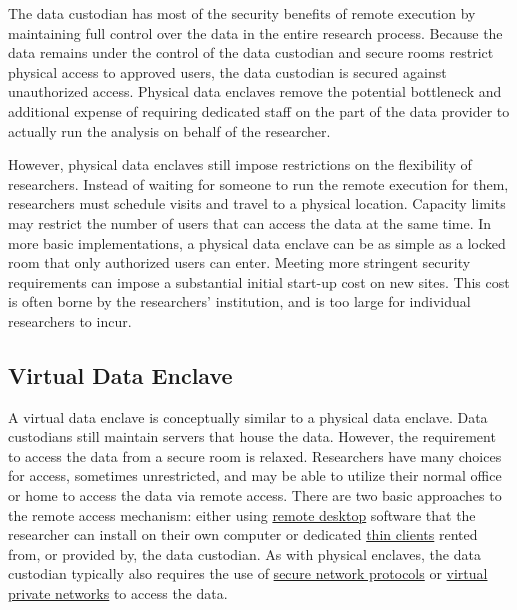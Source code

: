 The data custodian has most of the security benefits of remote execution by maintaining full control over the data in the entire research process. Because the data remains under the control of the data custodian and secure rooms restrict physical access to approved users, the data custodian is secured against unauthorized access. Physical data enclaves remove the potential bottleneck and additional expense of requiring dedicated staff on the part of the data provider to actually run the analysis on behalf of the researcher.

However, physical data enclaves still impose restrictions on the flexibility of researchers. Instead of waiting for someone to run the remote execution for them, researchers must schedule visits and travel to a physical location. Capacity limits may restrict the number of users that can access the data at the same time. In more basic implementations, a physical data enclave can be as simple as a locked room that only authorized users can enter. Meeting more stringent security requirements can impose a substantial initial start-up cost on new sites. This cost is often borne by the researchers' institution, and is too large for individual researchers to incur.

\hypertarget{virtual-data-enclave}{%
\subsection{Virtual Data Enclave}\label{virtual-data-enclave}}

A virtual data enclave is conceptually similar to a physical data enclave. Data custodians still maintain servers that house the data. However, the requirement to access the data from a secure room is relaxed. Researchers have many choices for access, sometimes unrestricted, and may be able to utilize their normal office or home to access the data via remote access. There are two basic approaches to the remote access mechanism: either using \protect\hyperlink{remote-desktop}{remote desktop} software that the researcher can install on their own computer or dedicated \protect\hyperlink{thin-clients}{thin clients} rented from, or provided by, the data custodian. As with physical enclaves, the data custodian typically also requires the use of \protect\hyperlink{secure-network-protocols}{secure network protocols} or \protect\hyperlink{virtual-private-networks}{virtual private networks} to access the data.


